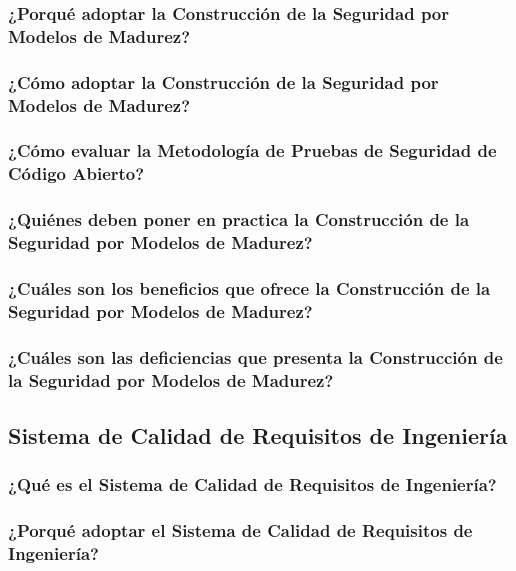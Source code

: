 \documentclass[runningheads,a4paper]{llncs}
\begin{document}
\subsubsection{¿Porqué adoptar la Construcción de la Seguridad por Modelos de Madurez?}

\subsubsection{¿Cómo adoptar la Construcción de la Seguridad por Modelos de Madurez?}

\subsubsection{¿Cómo evaluar la Metodología de Pruebas de Seguridad de Código Abierto?}

\subsubsection{¿Quiénes deben poner en practica la Construcción de la Seguridad por Modelos de Madurez?}

\subsubsection{¿Cuáles son los beneficios que ofrece la Construcción de la Seguridad por Modelos de Madurez?}

\subsubsection{¿Cuáles son las deficiencias que presenta la Construcción de la Seguridad por Modelos de Madurez?}


\subsection{Sistema de Calidad de Requisitos de Ingeniería}

\subsubsection{¿Qué es el Sistema de Calidad de Requisitos de Ingeniería?}

\subsubsection{¿Porqué adoptar el Sistema de Calidad de Requisitos de Ingeniería?}
\end{document}
